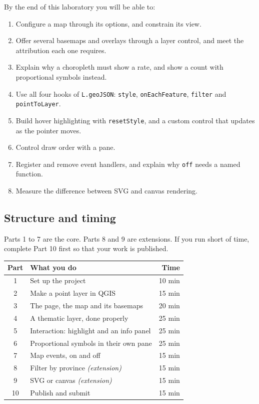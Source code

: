 \documentclass{article}
\newcommand{\cd}[1]{\texttt{#1}}
\begin{document}
By the end of this laboratory you will be able to:

\begin{enumerate}
  \item Configure a map through its options, and constrain its view.
  \item Offer several basemaps and overlays through a layer control, and
        meet the attribution each one requires.
  \item Explain why a choropleth must show a rate, and show a count
        with proportional symbols instead.
  \item Use all four hooks of \cd{L.geoJSON}: \cd{style},
        \cd{onEachFeature}, \cd{filter} and \cd{pointToLayer}.
  \item Build hover highlighting with \cd{resetStyle}, and a custom
        control that updates as the pointer moves.
  \item Control draw order with a pane.
  \item Register and remove event handlers, and explain why \cd{off}
        needs a named function.
  \item Measure the difference between SVG and canvas rendering.
\end{enumerate}

\subsection*{Structure and timing}

Parts 1 to 7 are the core. Parts 8 and 9 are extensions. If you run short
of time, complete Part 10 first so that your work is published.

\vspace{.6em}
\begin{tabularx}{\textwidth}{@{}c X r@{}}
\toprule
\textbf{Part} & \textbf{What you do} & \textbf{Time} \\
\midrule
1  & Set up the project                          & 10 min \\
2  & Make a point layer in QGIS                  & 15 min \\
3  & The page, the map and its basemaps          & 20 min \\
4  & A thematic layer, done properly             & 25 min \\
5  & Interaction: highlight and an info panel    & 25 min \\
6  & Proportional symbols in their own pane      & 25 min \\
7  & Map events, on and off                      & 15 min \\
\midrule
8  & Filter by province \textit{(extension)}     & 15 min \\
9  & SVG or canvas \textit{(extension)}          & 15 min \\
\midrule
10 & Publish and submit                          & 15 min \\
\bottomrule
\end{tabularx}
\end{document}
